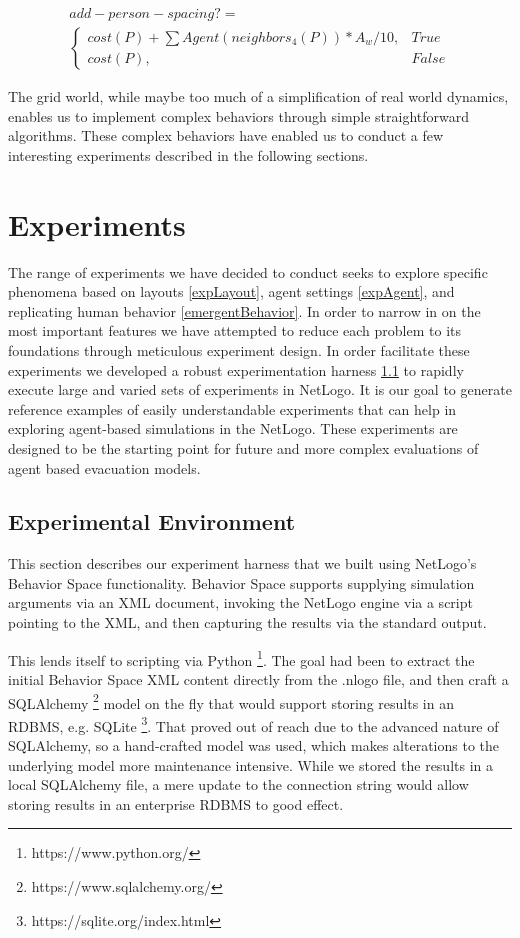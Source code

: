 \documentclass[12pt,letterpaper]{article}
\begin{document}
\begin{align}
add-person-spacing?= \nonumber  \\
\begin{cases}
	cost(P) + \sum Agent(neighbors_4(P)) * A_w / 10, & True \\
	cost(P), & False
\end{cases}
\end{align}

The grid world, while maybe too much of a simplification of real world dynamics, enables us to implement complex behaviors through simple straightforward algorithms.  These complex behaviors have enabled us to conduct a few interesting experiments described in the following sections.

\section{Experiments}

The range of experiments we have decided to conduct seeks to explore specific phenomena based on layouts \ref{expLayout}, agent settings \ref{expAgent}, and replicating human behavior \ref{emergentBehavior}.  In order to narrow in on the most important features we have attempted to reduce each problem to its foundations through meticulous experiment design.  In order facilitate these experiments we developed a robust experimentation harness \ref{expEnv} to rapidly execute large and varied sets of experiments in NetLogo.  It is our goal to generate reference examples of easily understandable experiments that can help in exploring agent-based simulations in the NetLogo.  These experiments are designed to be the starting point for future and more complex evaluations of agent based evacuation models.


\subsection{Experimental Environment} \label{expEnv}
This section describes our experiment harness that we built using NetLogo's
Behavior Space functionality.  Behavior Space supports supplying simulation arguments via an XML document,
invoking the NetLogo engine via a script pointing to the XML, and then capturing
the results via the standard output.

This lends itself to scripting via Python \footnote{https://www.python.org/}. The goal had been to extract the
initial Behavior Space XML content directly from the .nlogo file, and then craft
a SQLAlchemy \footnote{https://www.sqlalchemy.org/} model on the fly that would support storing results in an RDBMS,
e.g. SQLite \footnote{https://sqlite.org/index.html}. That proved out of reach due to the advanced nature of SQLAlchemy,
so a hand-crafted model was used, which makes alterations to the underlying
model more maintenance intensive.  While we stored the results in a local SQLAlchemy file, a mere update to the
connection string would allow storing results in an enterprise RDBMS to good
effect.
\end{document}
